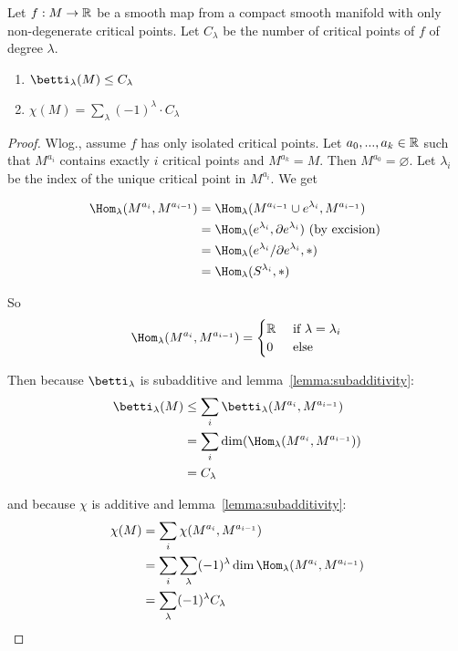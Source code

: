 \begin{theorem}
   \label{theorem:weak morse inequalities}
   Let $f: M \rightarrow {\mathbb R}$ be a smooth map from a compact smooth manifold with 
   only non-degenerate critical points. Let $C_{\lambda}$ be the number of 
   critical points of $f$ of degree $\lambda$.
   \begin{enumerate}
      \item $\betti_{\lambda} (M) \leq C_{\lambda}$
      \item $\chi(M) = \sum_{\lambda} (-1)^{\lambda} \cdot C_{\lambda} $
   \end{enumerate}
\end{theorem}

\begin{proof}
   Wlog., assume $f$ has only isolated critical points. Let $a_0, ..., a_k \in {\mathbb R}$
   such that $M^{a_i}$ contains exactly $i$ critical points and $M^{a_k} = M$.
   Then $M^{a_0} = \varnothing$. Let $\lambda_i$ be the index of the unique 
   critical point in $M^{a_i}$. We get

   \begin{align*}
      \Hom_{\lambda}(M^{a_i}, M^{a_{i-1}}) 
         & = \Hom_{\lambda}(M^{a_{i-1}} \cup e^{\lambda_i}, M^{a_{i-1}}) \\
         & = \Hom_{\lambda}(e^{\lambda_i}, \del e^{\lambda_i}) \text{ (by excision) } \\
         & = \Hom_{\lambda}(e^{\lambda_i}/ \del e^{\lambda_i}, \ast) \\
         & = \Hom_{\lambda}(S^{\lambda_i}, \ast) 
   \end{align*}

   So
   \[ 
      \Hom_{\lambda}(M^{a_i}, M^{a_{i-1}}) = \begin{cases}
         \R & \text{ if } \lambda = \lambda_i \\
         0 & \text{ else }
      \end{cases}
   \]

   Then because $\betti_{\lambda}$ is subadditive and 
   lemma~\ref{lemma:subadditivity}:
   \begin{align*}
      \betti_{\lambda}(M) 
         & \leq \sum_i \betti_{\lambda}(M^{a_i}, M^{a_{i-1}}) \\
         & = \sum_i \dim(\Hom_{\lambda}(M^{a_i}, M^{a_{i-1}})) \\
         & = C_{\lambda}
   \end{align*}

   and because $\chi$ is additive and lemma~\ref{lemma:subadditivity}:
   \begin{align*}
      \chi(M) 
         & = \sum_i \chi (M^{a_i}, M^{a_{i-1}}) \\
         & = \sum_i \sum_{\lambda} (-1)^{\lambda} \dim \Hom_{\lambda} (M^{a_i}, M^{a_{i-1}}) \\
         & = \sum_{\lambda} (-1)^{\lambda} C_{\lambda}
   \end{align*}
\end{proof}


